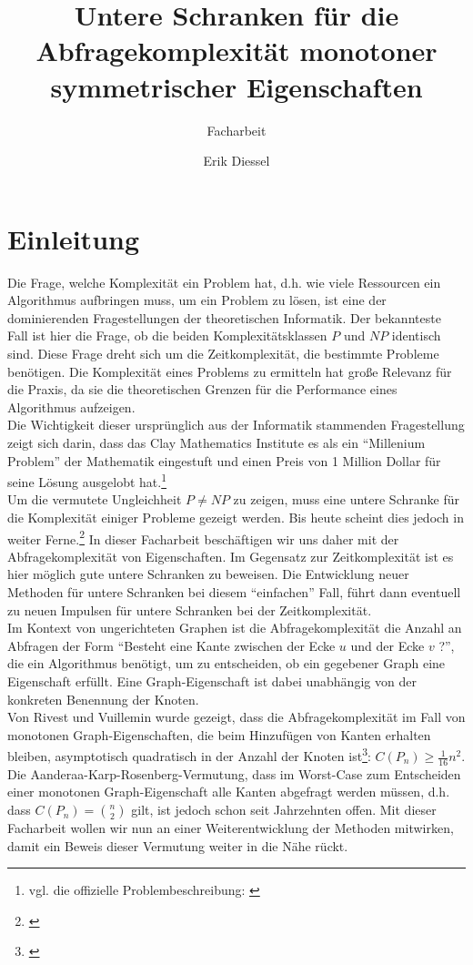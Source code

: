 \documentclass[10pt,a4paper]{scrreprt}
\title{Untere Schranken für die Abfragekomplexität 
       monotoner symmetrischer Eigenschaften}
\subtitle{Facharbeit}
\author{Erik Diessel}
\theoremstyle{definition}
\begin{document}
\maketitle

\tableofcontents
\thispagestyle{empty}

\chapter{Einleitung}
Die Frage, welche Komplexität ein Problem hat, d.h.
wie viele Ressourcen ein Algorithmus aufbringen muss,
um ein Problem zu lösen, ist eine der dominierenden
Fragestellungen der theoretischen Informatik.
Der bekannteste Fall ist hier die Frage, ob die beiden
Komplexitätsklassen $P$ und $NP$ identisch sind. Diese
Frage dreht sich um die Zeitkomplexität, die bestimmte
Probleme benötigen. Die Komplexität eines Problems zu ermitteln hat
große Relevanz für die Praxis, da sie die theoretischen
Grenzen für die Performance eines Algorithmus aufzeigen. \\
Die Wichtigkeit dieser ursprünglich aus der Informatik
stammenden Fragestellung zeigt sich darin, dass das Clay
Mathematics Institute es als ein "`Millenium Problem"'
der Mathematik eingestuft und einen Preis von
1 Million Dollar für seine Lösung ausgelobt hat.\footnote{
vgl. die offizielle Problembeschreibung:
\cite{PvsNPOfficial}} \\
Um die vermutete Ungleichheit $P\neq NP$ zu zeigen,
muss eine untere Schranke für die Komplexität einiger
Probleme gezeigt werden. Bis heute scheint dies jedoch
in weiter Ferne.\footnote{\cite{PvsNP}}
In dieser Facharbeit beschäftigen wir uns daher mit
der  Abfragekomplexität von Eigenschaften. Im Gegensatz
zur Zeitkomplexität ist es hier möglich gute
untere Schranken zu beweisen. Die Entwicklung
neuer Methoden für untere Schranken bei diesem "`einfachen"' Fall,
führt dann eventuell zu neuen Impulsen für untere
Schranken bei der Zeitkomplexität. \\
Im Kontext von ungerichteten Graphen
ist die Abfragekomplexität die Anzahl
an Abfragen der Form "`Besteht eine Kante zwischen
der Ecke $u$ und der Ecke $v$ ?"', die ein Algorithmus
benötigt, um zu entscheiden, ob ein gegebener Graph
eine Eigenschaft erfüllt. Eine Graph-Eigenschaft ist
dabei unabhängig von der konkreten Benennung der Knoten. \\
Von Rivest und Vuillemin wurde gezeigt,
dass die Abfragekomplexität
im Fall von monotonen Graph-Eigenschaften, die beim 
Hinzufügen von Kanten erhalten bleiben, asymptotisch
quadratisch in der Anzahl der Knoten
ist\footnote{\cite{Rivest}}: $C(P_n) \geq \frac{1}{16}n^2$.
Die Aanderaa-Karp-Rosenberg-Vermutung, dass im Worst-Case
zum Entscheiden einer monotonen Graph-Eigenschaft
alle Kanten abgefragt werden müssen, d.h. dass
$C(P_n)=\binom{n}{2}$ gilt, ist jedoch schon
seit Jahrzehnten offen. Mit dieser Facharbeit
wollen wir nun an einer Weiterentwicklung der
Methoden mitwirken, damit ein Beweis dieser Vermutung
weiter in die Nähe rückt.
\end{document}
